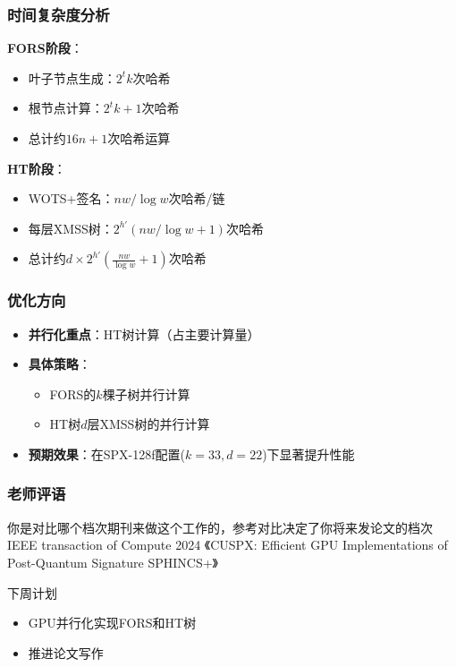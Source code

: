 \documentclass[slide]{../../custom}
\begin{document}
\begin{frame}
  \frametitle{时间复杂度分析}
  \textbf{FORS阶段}：
  \begin{itemize}
    \item 叶子节点生成：$2^t k$次哈希
    \item 根节点计算：$2^t k + 1$次哈希
    \item 总计约$16n + 1$次哈希运算
  \end{itemize}

  \textbf{HT阶段}：
  \begin{itemize}
    \item WOTS+签名：$n w / \log w$次哈希/链
    \item 每层XMSS树：$2^{h'} (nw/\log{w} + 1)$次哈希
    \item 总计约$d \times 2^{h'} (\frac{n w}{\log w} + 1)$次哈希
  \end{itemize}
\end{frame}

\begin{frame}
  \frametitle{优化方向}
  \begin{itemize}
    \item \textbf{并行化重点}：HT树计算（占主要计算量）
    \item \textbf{具体策略}：
      \begin{itemize}
        \item FORS的$k$棵子树并行计算
        \item HT树$d$层XMSS树的并行计算
      \end{itemize}
    \item \textbf{预期效果}：在SPX-128f配置($k=33, d=22$)下显著提升性能
  \end{itemize}
\end{frame}

\begin{frame}
  \frametitle{老师评语}
  \begin{alertblock}{你是对比哪个档次期刊来做这个工作的，参考对比决定了你将来发论文的档次}
    IEEE transaction of Compute 2024 《CUSPX: Efficient GPU Implementations of Post-Quantum Signature SPHINCS+》
  \end{alertblock}
  \begin{block}{下周计划}
    \begin{itemize}
      \item GPU并行化实现FORS和HT树
      \item 推进论文写作
    \end{itemize}
  \end{block}
\end{frame}
\end{document}
